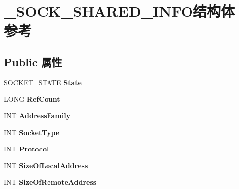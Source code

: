 \hypertarget{struct___s_o_c_k___s_h_a_r_e_d___i_n_f_o}{}\section{\+\_\+\+S\+O\+C\+K\+\_\+\+S\+H\+A\+R\+E\+D\+\_\+\+I\+N\+F\+O结构体 参考}
\label{struct___s_o_c_k___s_h_a_r_e_d___i_n_f_o}
\subsection*{Public 属性}
\begin{DoxyCompactItemize}
\item 
\mbox{\label{struct___s_o_c_k___s_h_a_r_e_d___i_n_f_o_a3c6458b0022cbf811176c10da7b5c307}} 
S\+O\+C\+K\+E\+T\+\_\+\+S\+T\+A\+TE {\bfseries State}
\item 
\mbox{\label{struct___s_o_c_k___s_h_a_r_e_d___i_n_f_o_a70378c94ec3f32f3e49ad201c5db3f14}} 
L\+O\+NG {\bfseries Ref\+Count}
\item 
\mbox{\label{struct___s_o_c_k___s_h_a_r_e_d___i_n_f_o_a3cea555d737508db44be06ab8bfcf5b7}} 
I\+NT {\bfseries Address\+Family}
\item 
\mbox{\label{struct___s_o_c_k___s_h_a_r_e_d___i_n_f_o_ab54e9d41e6c82092e24a06d50e10975f}} 
I\+NT {\bfseries Socket\+Type}
\item 
\mbox{\label{struct___s_o_c_k___s_h_a_r_e_d___i_n_f_o_a02ea32d0cf89340e8bd9e7b3f16a4f04}} 
I\+NT {\bfseries Protocol}
\item 
\mbox{\label{struct___s_o_c_k___s_h_a_r_e_d___i_n_f_o_a23de3d5c137ae7e3140d3ddb00b52a8e}} 
I\+NT {\bfseries Size\+Of\+Local\+Address}
\item 
\mbox{\label{struct___s_o_c_k___s_h_a_r_e_d___i_n_f_o_a9c7257062e377d3f2957f35508709ed5}} 
I\+NT {\bfseries Size\+Of\+Remote\+Address}
\item 

\end{DoxyCompactItemize}
